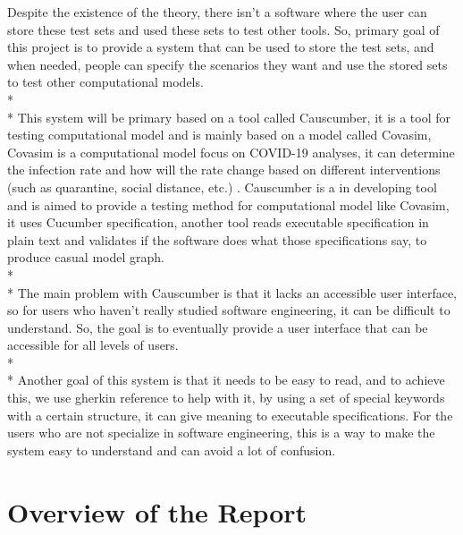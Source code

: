 Despite the existence of the theory, there isn’t a software where the user can store these test sets and used these sets to test other tools. So, primary goal of this project is to provide a system that can be used to store the test sets, and when needed, people can specify the scenarios they want and use the stored sets to test other computational models. \\*\\*
This system will be primary based on a tool called Causcumber, it is a tool for testing computational model and is mainly based on a model called Covasim, Covasim is a computational model focus on COVID-19 analyses, it can determine the infection rate and how will the rate change based on different interventions (such as quarantine, social distance, etc.) \cite{Reference3}. Causcumber is a in developing tool and is aimed to provide a testing method for computational model like Covasim, it uses Cucumber specification, another tool reads executable specification in plain text and validates if the software does what those specifications say, to produce casual model graph. \\*\\*
The main problem with Causcumber is that it lacks an accessible user interface, so for users who haven’t really studied software engineering, it can be difficult to understand. So, the goal is to eventually provide a user interface that can be accessible for all levels of users. \\*\\*
Another goal of this system is that it needs to be easy to read, and to achieve this, we use gherkin reference to help with it, by using a set of special keywords with a certain structure, it can give meaning to executable specifications. For the users who are not specialize in software engineering, this is a way to make the system easy to understand and can avoid a lot of confusion.


\section{Overview of the Report}

